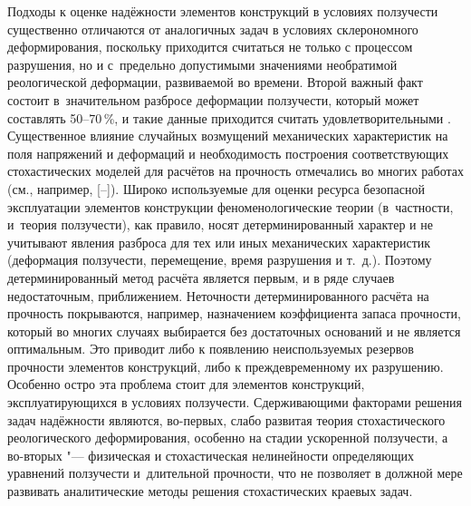  Подходы к оценке надёжности элементов конструкций в условиях ползучести существенно отличаются от аналогичных задач в условиях склерономного деформирования, поскольку приходится считаться не только с процессом разрушения, но и с~предельно допустимыми значениями необратимой реологической деформации, развиваемой во времени. Второй важный факт состоит в~значительном разбросе деформации ползучести, который может составлять 50--70\,\%, и такие данные приходится считать удовлетворительными \cite{rad:bib:1}. Существенное влияние случайных возмущений механических характеристик на поля напряжений и деформаций и необходимость построения соответствующих стохастических моделей для расчётов на прочность отмечались во многих работах (см., например, [--]). Широко используемые для оценки ресурса безопасной эксплуатации элементов конструкции феноменологические теории (в~частности, и~теория ползучести), как правило, носят детерминированный характер и не учитывают явления разброса для тех или иных механических характеристик (деформация ползучести, перемещение, время разрушения и т.~д.). 
Поэтому детерминированный метод расчёта является первым, и в ряде случаев недостаточным, приближением. Неточности детерминированного расчёта на прочность покрываются, например, назначением коэффициента запаса прочности, который во многих случаях выбирается без достаточных оснований и не является оптимальным. 
Это приводит либо к появлению неиспользуемых резервов прочности элементов конструкций, либо к преждевременному их разрушению. 
Особенно остро эта проблема стоит для элементов конструкций, эксплуатирующихся в условиях ползучести. 
Сдерживающими факторами решения задач надёжности являются, во-первых, слабо развитая теория стохастического реологического деформирования, особенно на стадии ускоренной ползучести, а во-вторых "--- физическая и стохастическая нелинейности определяющих уравнений ползучести и~длительной прочности, что не позволяет в должной мере развивать аналитические методы решения стохастических краевых задач. 
